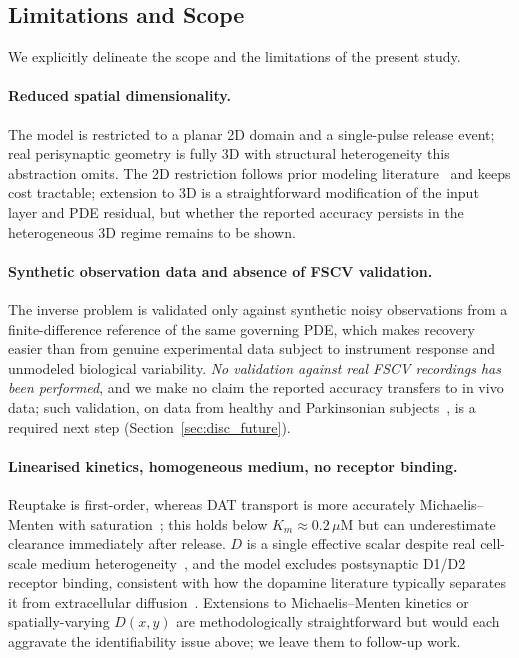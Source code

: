 \documentclass[pdflatex,sn-basic,Numbered]{sn-jnl}
\theoremstyle{thmstyleone}
\theoremstyle{thmstyletwo}
\begin{document}
\subsection{Limitations and Scope}
\label{sec:limitations}

We explicitly delineate the scope and the limitations of the
present study.

\paragraph{Reduced spatial dimensionality.}
The model is restricted to a planar 2D domain and a
single-pulse release event; real perisynaptic geometry is fully
3D with structural heterogeneity this abstraction omits. The 2D
restriction follows prior modeling
literature~\cite{Wiencke2020} and keeps cost tractable;
extension to 3D is a straightforward modification of the input
layer and PDE residual, but whether the reported accuracy
persists in the heterogeneous 3D regime remains to be shown.

\paragraph{Synthetic observation data and absence of FSCV
validation.}
The inverse problem is validated only against synthetic noisy
observations from a finite-difference reference of the same
governing PDE, which makes recovery easier than from genuine
experimental data subject to instrument response and unmodeled
biological variability. \emph{No validation against real FSCV
recordings has been performed}, and we make no claim the
reported accuracy transfers to in vivo data; such validation,
on data from healthy and Parkinsonian
subjects~\cite{Rodeberg2017}, is a required next step
(Section~\ref{sec:disc_future}).

\paragraph{Linearised kinetics, homogeneous medium, no receptor
binding.}
Reuptake is first-order, whereas DAT transport is more
accurately Michaelis--Menten with saturation~\cite{Wiencke2020,
CraggRice2004}; this holds below $K_m \approx 0.2\,\mu$M but can
underestimate clearance immediately after release. $D$ is a
single effective scalar despite real cell-scale medium
heterogeneity~\cite{CraggRice2004, Nicholson1981}, and the model
excludes postsynaptic D1/D2 receptor binding, consistent with
how the dopamine literature typically separates it from
extracellular diffusion~\cite{Rice2008}. Extensions to
Michaelis--Menten kinetics or spatially-varying $D(x,y)$ are
methodologically straightforward but would each aggravate the
identifiability issue above; we leave them to follow-up work.
\end{document}
